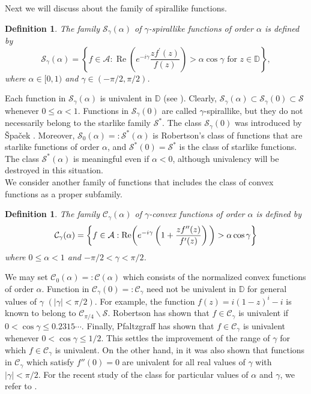 \documentclass[a4paper,12pt]{amsart}
\newtheorem{definition}[theorem]{Definition}
\theoremstyle{definition}
\numberwithin{equation}{section}
\begin{document}
\noindent Next we will discuss about the family of spirallike functions.
\begin{definition}
The family $\mathcal{S}_\gamma(\alpha)$ of $\gamma$-spirallike functions of order $\alpha$ is defined by
$$
\mathcal{S}_\gamma(\alpha)=\left\{f \in \mathcal{A}: \operatorname{Re}\left(e^{-i \gamma} \frac{z f^{\prime}(z)}{f(z)}\right)>\alpha \cos \gamma \text { for } z \in \mathbb{D}\right\},
$$
where $\alpha \in[0,1)$ and $\gamma \in(-\pi / 2, \pi / 2)$.
\end{definition}
\noindent Each function in $\mathcal{S}_\gamma(\alpha)$ is univalent in $\mathbb{D}$ (see \cite{16}). Clearly, $\mathcal{S}_\gamma(\alpha) \subset \mathcal{S}_\gamma(0) \subset \mathcal{S}$ whenever $0 \leq \alpha<1$. Functions in $\mathcal{S}_\gamma(0)$ are called $\gamma$-spirallike, but they do not necessarily belong to the starlike family $\mathcal{S}^*$. The class $\mathcal{S}_\gamma(0)$ was introduced by Špaček \cite{27}. Moreover, $\mathcal{S}_0(\alpha)=: \mathcal{S}^*(\alpha)$ is Robertson's class of functions that are starlike functions of order $\alpha$, and $\mathcal{S}^*(0)=\mathcal{S}^*$ is the class of starlike functions. The class $\mathcal{S}^*(\alpha)$ is meaningful even if $\alpha<0$, although univalency will be destroyed in this situation. \\[2mm]
We consider another family of functions that includes the class of convex functions as a proper
subfamily.
\begin{definition}
The family $\mathcal{C}_\gamma (\alpha )$ of  $\gamma$-convex functions of order $\alpha$ is defined by
$$
{\mathcal C}_\gamma (\alpha)=\left\{f\in \mathcal{A}:{\rm Re } \bigg( e^{-i\gamma }\left ( 1+\frac{zf''(z)}{f'(z)}\right )\bigg)>\alpha \cos \gamma\right\}
$$
where $0\le \alpha <1$ and $-\pi/2<\gamma<\pi/2$.
\end{definition} 
\noindent We may set ${\mathcal C}_0(\alpha)=:{\mathcal C}(\alpha)$ which consists of the normalized
convex functions of order $\alpha$. Function in ${\mathcal C}_\gamma (0)=:{\mathcal C}_{\gamma}$ need not be
univalent in $\mathbb{D}$ for general values of $\gamma $
$(|\gamma|<\pi/2)$. For example, the function
$f(z)=i(1-z)^i-i$ is known to belong to
${\mathcal C}_{\pi/4}\backslash {\mathcal S}$. Robertson
\cite{Robertson-69} has shown  that $f\in\mathcal{C}_{\gamma}$ is
univalent if $0<\cos \gamma\leq 0.2315\cdots$. Finally, Pfaltzgraff \cite{Pfaltzgraff} has shown that
$f\in\mathcal{C}_{\gamma}$ is univalent whenever $0<\cos \gamma\leq
1/2$. This settles the improvement of the range of $\gamma$ for which $f\in\mathcal{C}_{\gamma}$
is univalent. On the other hand,  in \cite{SinghChic-77} it was also shown that
functions in ${\mathcal C}_\gamma$ which satisfy $f''(0)=0$ are
univalent for all real values of $\gamma$ with $|\gamma|<\pi /2$.
For the recent study of the class for particular values of $\alpha$ and $\gamma$, we refer to \cite{APS19}.
\end{document}
